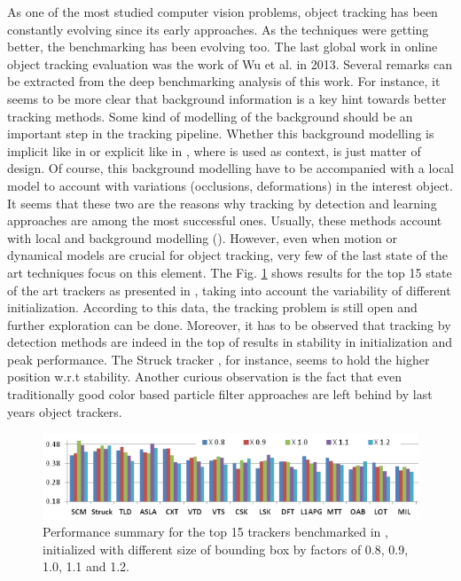 As one of the most studied computer vision problems, object tracking has been constantly evolving since its early approaches. 
As the techniques were getting better, the benchmarking has been evolving too. The last global work in online object tracking evaluation 
was the work of Wu et al. \cite{c16} in 2013. Several remarks can be extracted from the deep benchmarking analysis of this work. 
For instance, it seems to be more clear that background information is a key hint towards 
better tracking methods. Some kind of modelling of the background should be an important 
step in the tracking pipeline. Whether this background modelling is implicit like in \cite{c23} or 
explicit like in \cite{c22}, where is used as context, is just matter of design. Of course, this 
background modelling have to be accompanied with a local model to account with variations (occlusions, deformations) in the interest object. 
It seems that these two are the reasons why tracking by detection and learning approaches are among the most successful ones. Usually, 
these methods account with local and background modelling (\cite{c22}\cite{c23}\cite{c24}\cite{c25}\cite{c26}). 
However, even when motion or dynamical models are crucial for object tracking, very few of the last state of the art techniques focus on this 
element. The Fig. \ref{tr_per} shows results for the top 15 state of the art trackers as presented in \cite{c16}, taking into account 
the variability of different initialization. According to this data, the tracking problem is still open and further exploration can be done. 
Moreover, it has to be observed that tracking by detection methods are indeed in the top of results in stability in initialization and peak performance. 
The Struck tracker \cite{c23}, for instance, seems to hold the higher position w.r.t stability. Another curious observation is the fact that even traditionally good color based particle filter approaches are left behind by last years object trackers.

   \begin{figure}[thpb]
      \centering
      \includegraphics[width=1.0\textwidth]{../images/trackers_performance.png}
      \caption{ Performance summary for the top 15 trackers benchmarked in \cite{c16}, initialized with different size of bounding box by factors of 0.8, 0.9, 1.0, 1.1 and 1.2. }
      \label{tr_per}
   \end{figure}

